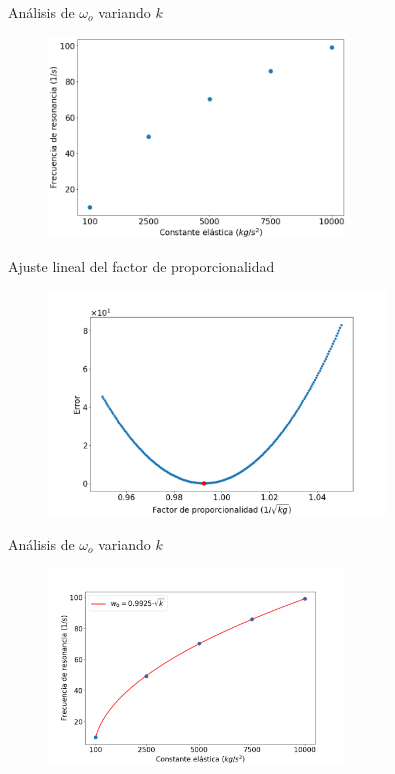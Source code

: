 \begin{frame}{Análisis de $\omega_o$ variando $k$}
        \begin{figure}[H]
            \centering
            \includegraphics[width=0.7\textwidth]{pic/05-results/w_k}
            \label{fig:w_k}
        \end{figure}
\end{frame}

\begin{frame}{Ajuste lineal del factor de proporcionalidad}
    \begin{minipage}[c]{0.8\linewidth}
        \begin{figure}[H]
            \centering
            \includegraphics[width=0.8\textwidth]{pic/05-results/prop_error}
            \label{fig:prop-error}
        \end{figure}
    \end{minipage}
    \begin{minipage}{0.15\linewidth}
        \large{}
    \end{minipage}
\end{frame}

\begin{frame}{Análisis de $\omega_o$ variando $k$}
    \begin{figure}
        \centering
        \includegraphics[width=0.7\textwidth]{pic/05-results/prop_relation}
        \label{fig:prop-relation}
    \end{figure}
\end{frame}
